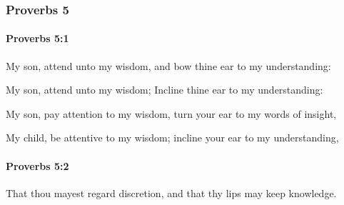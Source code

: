 	\subsubsection{Proverbs 5} %
		\label{PROVERBS-5}

		\paragraph{Proverbs 5:1} %
			\label{PROVERBS-5-1}

			My son, attend unto my wisdom, and bow thine ear to my understanding:

			\begin{versebox}
					\item[BHS] 
					\item[ASV] My son, attend unto my wisdom; Incline thine ear to my understanding:
					\item[NIV] My son, pay attention to my wisdom, turn your ear to my words of insight,
					\item[NRSV] My child, be attentive to my wisdom; incline your ear to my understanding,
			\end{versebox}

		\paragraph{Proverbs 5:2} %
			\label{PROVERBS-5-2}

			That thou mayest regard discretion, and that thy lips may keep knowledge.

